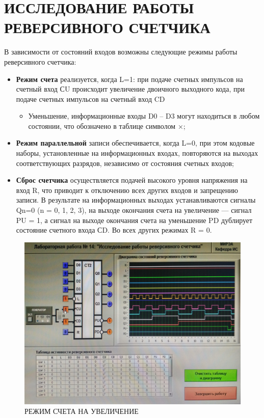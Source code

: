 \section{ИССЛЕДОВАНИЕ РАБОТЫ РЕВЕРСИВНОГО СЧЕТЧИКА}

В зависимости от состояний входов возможны следующие режимы
работы реверсивного счетчика:

\begin{itemize}
	\item \textbf{Режим счета} реализуется, когда L=1: при подаче счетных
	импульсов на счетный вход СU происходит увеличение двоичного
	выходного кода, при подаче счетных импульсов на счетный вход CD
	
	\begin{itemize}
		\item Уменьшение, информационные входы D0 – D3 могут находиться в
		любом состоянии, что обозначено в таблице символом ×;
	\end{itemize}

		\item \textbf{Режим параллельной} записи обеспечивается,
		когда L=0, при этом кодовые наборы, установленные на
		информационных входах, повторяются на выходах соответствующих
		разрядов, независимо от состояния счетных входов;
	
		\item \textbf{Сброс счетчика} осуществляется подачей высокого уровня
		напряжения на вход R, что приводит к отключению всех других
		входов и запрещению записи. В результате на информационных
		выходах устанавливаются сигналы Qn=0 (n = 0, 1, 2, 3), на выходе
		окончания счета на увеличение — сигнал PU = 1, а сигнал на выходе
		окончания счета на уменьшение PD дублирует состояние счетного
		входа СD. Во всех других режимах R = 0.


\end{itemize}

\begin{figure}[H]
	\centering
	\includegraphics[width=0.95\linewidth]{imgs/14/1.jpg}
	\caption{РЕЖИМ СЧЕТА НА УВЕЛИЧЕНИЕ}
	\label{fig:14_1}
\end{figure}

